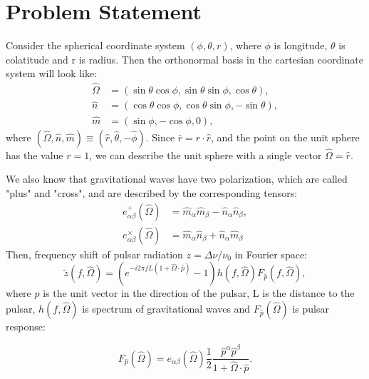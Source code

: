 \section{Problem Statement}

Consider the spherical coordinate system $(\phi, \theta, r)$, where $\phi$ is longitude, $\theta$ is colatitude and r is radius. Then the orthonormal basis in the cartesian coordinate system will look like:
\begin{subequations}
\begin{align}
    \hat{\Omega} &= \left(\sin \theta \cos \phi, \sin \theta \sin \phi, \cos \theta \right), \\
    \hat{n} &= (\cos \theta \cos \phi, \cos \theta \sin \phi, - \sin \theta), \\
    \hat{m} &= (\sin \phi, - \cos \phi, 0),
\end{align}
\end{subequations}
where $(\hat{\Omega}, \hat{n}, \hat{m}) \equiv (\hat{r}, \hat{\theta}, -\hat{\phi})$. Since $\bar{r} = r \cdot \hat{r}$, and the point on the unit sphere has the value $r = 1$, we can describe the unit sphere with a single vector $\hat{\Omega} = \hat{r}$.

We also know that gravitational waves have two polarization, which are called "plus" and "cross", and are described by the corresponding tensors:
\begin{subequations}
\begin{align}
    e^+_{\alpha \beta}(\hat{\Omega}) &= \hat{m}_{\alpha} \hat{m}_{\beta} - \hat{n}_{\alpha} \hat{n}_{\beta}, \\
    e^{\times}_{\alpha \beta}(\hat{\Omega}) &= \hat{m}_{\alpha} \hat{n}_{\beta} + \hat{n}_{\alpha} \hat{m}_{\beta}
\end{align}
\end{subequations}
Then, frequency shift of pulsar radiation $z = \Delta \nu/\nu_0$ in Fourier space:
\begin{equation}
    \tilde{z}(f, \hat{\Omega}) = \left( e^{- i 2 \pi f L (1 + \hat{\Omega} \cdot \hat{p})} - 1\right) h(f, \hat{\Omega}) F_{\hat{p}}(f, \hat{\Omega}),
\end{equation}
where $\hat{p}$ is the unit vector in the direction of the pulsar, L is the distance to the pulsar, $h(f, \hat{\Omega})$ is spectrum of gravitational waves and $F_{\hat{p}}(\hat{\Omega})$ is pulsar response:

\begin{equation}
F_{\hat{p}}(\hat{\Omega}) = e_{\alpha \beta}(\hat{\Omega}) \frac{1}{2} \frac{\hat{p}^{\alpha} \hat{p}^{\beta}}{1 + \hat{\Omega} \cdot \hat{p}}.
\end{equation}

